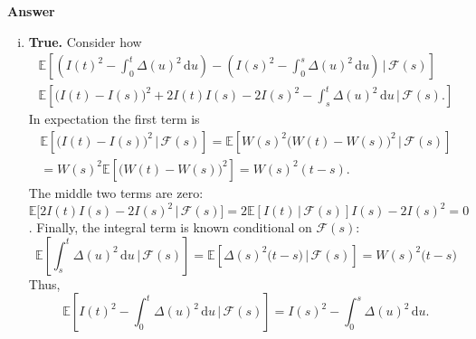 \documentclass[11pt]{article}
\newcommand\E{\mathbb{E}}
\newcommand\cF{\mathcal{F}}
\newenvironment{hwanswer}
    {
        \vspace{2mm}
        {\bfseries Answer}
        \vspace{-\abovedisplayskip}
        \begin{center}
            \begin{tcolorbox}[
                width=0.95\textwidth,
                colback=white,
                colframe=white,
                opacityback=0,
                opacityframe=0,
                boxrule=0pt,
                frame hidden,
                breakable,
                before upper={\parindent15pt} %
            ]
            \lineskip=0pt %
    }
    {
        \end{tcolorbox}
        \end{center}
        \vspace{4mm}
    }
\begin{document}
\begin{hwanswer}
\begin{enumerate}[(i)]
            \item {\bfseries True.} Consider how
            \[
                \begin{multlined}
                    \E\left[
                        \left(
                            I(t)^2 - \int_{0}^{t} \Delta(u)^2 \, \text{d} u
                        \right)
                        -
                        \left(
                            I(s)^2 - \int_{0}^{s} \Delta(u)^2 \, \text{d} u
                        \right)
                        \, \bigg| \,
                        \cF(s)
                    \right]
                    \\
                    \E\left[
                        \big( I(t) - I(s) \big)^2
                        +
                        2 I(t) I(s) - 2I(s)^2
                        -
                        \int_{s}^{t} \Delta(u)^2 \, \text{d} u
                        \, \bigg| \,
                        \cF(s).
                    \right]
                \end{multlined}
            \]
            In expectation the first term is
            \[
                \begin{multlined}
                    \E\left[
                        \big( I(t) - I(s) \big)^2
                        \, | \,
                        \cF(s)
                    \right]
                    =
                    \E\left[
                        W(s)^2 \big( W(t) - W(s) \big)^2
                        \, | \,
                        \cF(s)
                    \right]
                    \\
                    =
                    W(s)^2
                    \E\left[ \big(W(t) - W(s)\big)^2 \right]
                    =
                    W(s)^2 (t - s).
                \end{multlined}
            \]
            The middle two terms are zero: $\E\big[ 2 I(t) I(s) - 2 I(s)^2 \, | \, \cF(s)
            \big] = 2 \E[I(t) \, | \, \cF(s)] I(s) - 2 I(s)^2 = 0$. Finally, the integral
            term is known conditional on $\cF(s)$:
            \[
                \E\left[
                    \int_{s}^{t}
                    \Delta(u)^2 \, \text{d} u
                    \, \bigg| \,
                    \cF(s)
                \right]
                =
                \E\left[
                    \Delta(s)^2 \big(t - s \big)
                    \, | \,
                    \cF(s)
                \right]
                =
                W(s)^2 \big( t - s \big)
            \]
            Thus,
            \[
                \E\left[
                    I(t)^2 - \int_{0}^{t} \Delta(u)^2 \, \text{d} u
                    \, \bigg| \,
                    \cF(s)
                \right]
                =
                I(s)^2 - \int_{0}^{s} \Delta(u)^2 \, \text{d} u.
            \]
        \end{enumerate}
    \end{hwanswer}
\end{document}

